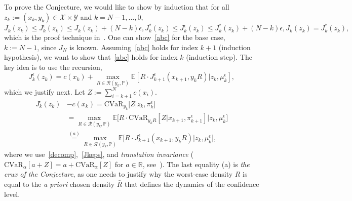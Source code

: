 \documentclass[letterpaper, 10 pt, conference]{ieeeconf}  %
\begin{document}
To prove the Conjecture, we would like to show  by induction that for all $z_k := (x_k, y_k) \in \mathcal{X} \times \mathcal{Y}$ and $k = N-1, \dots, 0$,
%
\begin{subequations}\label{abc}
\begin{equation}
J_k(z_k) \leq J_k^\epsilon(z_k) \leq J_k(z_k) + (N-k)\epsilon, 
\label{a}\end{equation}
%
\begin{equation}
J_k^*(z_k) \leq J_k^\epsilon(z_k) \leq J_k^*(z_k) + (N-k)\epsilon, 
\label{b}\end{equation}
%
\begin{equation}
J_k(z_k) = J_k^*(z_k), 
\label{c}\end{equation}
\end{subequations}
%
which is the proof technique in~\cite[Sec. 1.5]{bertsekas2005dynamic}. 
One can show~\eqref{abc} for the base case, $k := N-1$, since $J_N$ is known.
Assuming~\eqref{abc} holds for index $k+1$ (induction hypothesis), we want to show that~\eqref{abc} holds for index $k$ (induction step). The key 
idea is to use the recursion,
%
\begin{equation}
J_k^\epsilon(z_k) = c(x_k) + {\underset{R \in \mathcal{R}(y_k, \mathbb{P})}\max} \mathbb{E}[ R\cdot J^\epsilon_{k+1}(x_{k+1}, y_k R) | z_k, \mu_k^\epsilon],
\label{Jkepsrec}\end{equation}
%
which we justify next. Let $Z := \sum_{i=k+1}^N c(x_i)$. 
%
\begin{equation*}\begin{aligned}
J_k^\epsilon(z_k)& - c(x_k) = \text{CVaR}_{y_k}\big[ Z \big| z_k, \pi_k^\epsilon \big]\\
& = {\underset{R \in \mathcal{R}(y_k, \mathbb{P})}\max}\mathbb{E}\big[ R\cdot \text{CVaR}_{y_k R}[ Z | x_{k+1}, \pi^\epsilon_{k+1} ] \big| z_k, \mu_k^\epsilon \big] \\
& {\overset{(a)}{=}} {\underset{R \in \mathcal{R}(y_k, \mathbb{P})}\max}\mathbb{E}\big[ R\cdot J_{k+1}^\epsilon(x_{k+1},y_k R) \big| z_k, \mu_k^\epsilon \big],
\end{aligned}\end{equation*}
%
where we use~\eqref{decomp},~\eqref{Jkeps}, and \textit{translation invariance} ($\text{CVaR}_\alpha[a+Z] = a + \text{CVaR}_\alpha[Z]$ for $a \in \mathbb{R}$, see~\cite[Sec. 2.2]{kisiala2015conditional}). 
The last equality (a) is {\em the crux of the Conjecture}, 
as one needs to justify why the worst-case density $R$ is equal to the \textit{a priori} chosen density $\bar{R}$ that defines the dynamics of the confidence level. 
\end{document}
